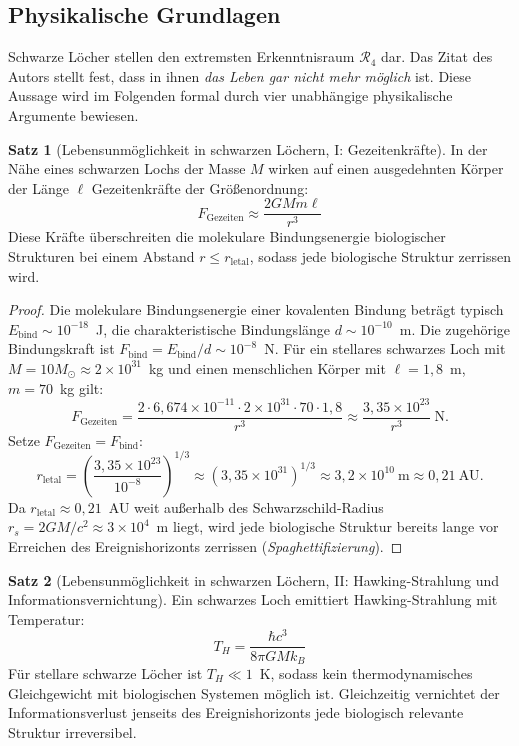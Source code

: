 ﻿\documentclass[a4paper,12pt]{article}
\theoremstyle{definition}
\newtheorem{satz}{Satz}
\begin{document}
\subsection{Physikalische Grundlagen}

Schwarze Löcher stellen den extremsten Erkenntnisraum $\mathcal{R}_4$ dar.
Das Zitat des Autors stellt fest, dass in ihnen \emph{das Leben gar nicht mehr
möglich} ist. Diese Aussage wird im Folgenden formal durch vier unabhängige
physikalische Argumente bewiesen.

\begin{satz}[Lebensunmöglichkeit in schwarzen Löchern, I: Gezeitenkräfte]
\label{satz:gezeiten}
    In der Nähe eines schwarzen Lochs der Masse $M$ wirken auf einen
    ausgedehnten Körper der Länge $\ell$ Gezeitenkräfte der Größenordnung:
    \[
        F_{\text{Gezeiten}} \approx \frac{2GM m \ell}{r^3}
    \]
    Diese Kräfte überschreiten die molekulare Bindungsenergie biologischer
    Strukturen bei einem Abstand $r \leq r_{\text{letal}}$, sodass jede
    biologische Struktur zerrissen wird.
\end{satz}

\begin{proof}
    Die molekulare Bindungsenergie einer kovalenten Bindung beträgt typisch
    $E_{\text{bind}} \sim 10^{-18}$~J, die charakteristische Bindungslänge
    $d \sim 10^{-10}$~m. Die zugehörige Bindungskraft ist
    $F_{\text{bind}} = E_{\text{bind}}/d \sim 10^{-8}$~N.
    Für ein stellares schwarzes Loch mit $M = 10 M_\odot \approx 2 \times 10^{31}$~kg
    und einen menschlichen Körper mit $\ell = 1{,}8$~m, $m = 70$~kg gilt:
    \[
        F_{\text{Gezeiten}} = \frac{2 \cdot 6{,}674\times10^{-11} \cdot 2\times10^{31}
        \cdot 70 \cdot 1{,}8}{r^3}
        \approx \frac{3{,}35 \times 10^{23}}{r^3}~\text{N}.
    \]
    Setze $F_{\text{Gezeiten}} = F_{\text{bind}}$:
    \[
        r_{\text{letal}} = \left(\frac{3{,}35 \times 10^{23}}{10^{-8}}\right)^{1/3}
        \approx \left(3{,}35 \times 10^{31}\right)^{1/3}
        \approx 3{,}2 \times 10^{10}~\text{m} \approx 0{,}21~\text{AU}.
    \]
    Da $r_{\text{letal}} \approx 0{,}21$~AU weit außerhalb des Schwarzschild-Radius
    $r_s = 2GM/c^2 \approx 3 \times 10^4$~m liegt, wird jede biologische Struktur
    bereits lange vor Erreichen des Ereignishorizonts zerrissen (\emph{Spaghettifizierung}).
    \qedhere
\end{proof}

\begin{satz}[Lebensunmöglichkeit in schwarzen Löchern, II: Hawking-Strahlung und Informationsvernichtung]
\label{satz:hawking}
    Ein schwarzes Loch emittiert Hawking-Strahlung mit Temperatur:
    \[
        T_H = \frac{\hbar c^3}{8 \pi G M k_B}
    \]
    Für stellare schwarze Löcher ist $T_H \ll 1$~K, sodass kein
    thermodynamisches Gleichgewicht mit biologischen Systemen möglich ist.
    Gleichzeitig vernichtet der Informationsverlust jenseits des
    Ereignishorizonts jede biologisch relevante Struktur irreversibel.
\end{satz}
\end{document}

